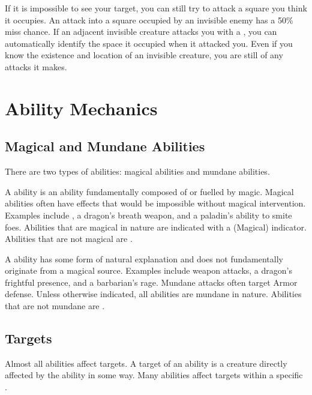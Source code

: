             If it is impossible to see your target, you can still try to attack a square you think it occupies.
            An attack into a square occupied by an invisible enemy has a 50\% miss chance.
            If an adjacent invisible creature attacks you with a , you can automatically identify the space it occupied when it attacked you.
            Even if you know the existence and location of an invisible creature, you are still \partiallyunaware of any attacks it makes.

\section{Ability Mechanics}\label{Ability Mechanics}

    \subsection{Magical and Mundane Abilities}\label{Magical and Mundane Abilities}

        There are two types of abilities: magical abilities and mundane abilities.

        \label{Magical Abilities} A  ability is an ability fundamentally composed of or fuelled by magic.
        Magical abilities often have effects that would be impossible without magical intervention.
        Examples include , a dragon's breath weapon, and a paladin's ability to smite foes.
        Abilities that are magical in nature are indicated with a (Magical) indicator.
        Abilities that are not magical are .

        \label{Mundane Abilities} A  ability has some form of natural explanation and does not fundamentally originate from a magical source.
        Examples include weapon attacks, a dragon's frightful presence, and a barbarian's rage.
        Mundane attacks often target Armor defense.
        Unless otherwise indicated, all abilities are mundane in nature.
        Abilities that are not mundane are .

    \subsection{Targets}\label{Targets}
        Almost all abilities affect targets.
        A target of an ability is a creature directly affected by the ability in some way.
        Many abilities affect targets within a specific .

